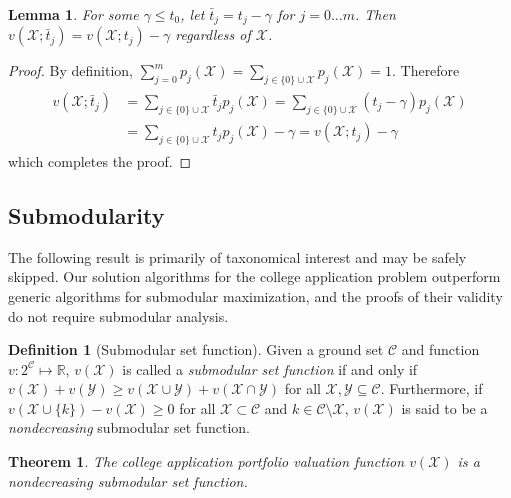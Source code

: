 \documentclass[11pt]{article} %
\newtheorem{theorem}{Theorem}
\newtheorem{lemma}{Lemma}
\theoremstyle{definition}
\newtheorem{definition}{Definition}
\begin{document}
\begin{lemma} \label{assumetzerozero}
For some $\gamma \leq t_0$, let $\bar t_j = t_j - \gamma$ for $j = 0 \dots m$. Then $v(\mathcal{X}; \bar t_j) = v(\mathcal{X};  t_j) -  \gamma$ regardless of $\mathcal{X}$. 
\end{lemma}
\begin{proof}
By definition, $\sum_{j=0}^m p_j(\mathcal{X}) = \sum_{j \in \{0\}\cup\mathcal{X}} p_j(\mathcal{X}) = 1$. Therefore
\begin{align}
\begin{split}
v(\mathcal{X}; \bar t_j) &= \sum_{j\in \{0\}\cup\mathcal{X}}  \bar t_j p_j(\mathcal{X})
=\sum_{j\in \{0\}\cup\mathcal{X}} (t_j - \gamma) p_j(\mathcal{X}) \\
&=\sum_{j\in \{0\}\cup\mathcal{X}} t_j p_j(\mathcal{X})  - \gamma 
= v(\mathcal{X}; t_j) - \gamma
\end{split} 
\end{align}
which completes the proof.
\end{proof}


\subsection{Submodularity}

The following result is primarily of taxonomical interest and may be safely skipped. Our solution algorithms for the college application problem outperform generic algorithms for submodular maximization, and the proofs of their validity do not require submodular analysis.

\begin{definition}[Submodular set function]
Given a ground set $\mathcal{C}$ and function $v : 2^{\mathcal{C}} \mapsto \mathbb{R}$, $v(\mathcal{X})$ is called a \emph{submodular set function} if and only if $v(\mathcal{X}) + v(\mathcal{Y}) \geq v(\mathcal{X}\cup\mathcal{Y}) + v(\mathcal{X}\cap\mathcal{Y})$
for all $\mathcal{X}, \mathcal{Y} \subseteq \mathcal{C}$. Furthermore, if $ v(\mathcal{X}\cup\{k\}) - v(\mathcal{X}) \geq 0$ for all $\mathcal{X} \subset \mathcal{C}$ and $k \in \mathcal{C} \setminus \mathcal{X}$, $v(\mathcal{X})$ is said to be a \emph{nondecreasing} submodular set function.
\end{definition}

\begin{theorem}
The college application portfolio valuation function
$v(\mathcal{X})$ %
is a nondecreasing submodular set function.
\end{theorem}
\end{document}
